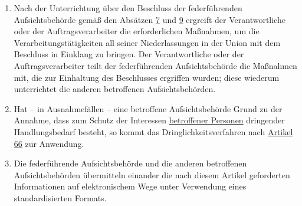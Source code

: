 \begin{enumerate}
  \item Nach der Unterrichtung über den Beschluss der federführenden Aufsichtsbehörde gemäß den Absätzen \hyperref
   [itm:60-7]{7} und \hyperref[itm:60-9]{9} ergreift der Verantwortliche oder der Auftragsverarbeiter die
   erforderlichen Maßnahmen, um die Verarbeitungstätigkeiten all seiner Niederlassungen in der Union mit dem Beschluss
   in Einklang zu bringen. Der Verantwortliche oder der Auftragsverarbeiter teilt der federführenden Aufsichtsbehörde
   die Maßnahmen mit, die zur Einhaltung des Beschlusses ergriffen wurden; diese wiederum unterrichtet die anderen
   betroffenen Aufsichtsbehörden.
  \label{itm:60-10}

  \item Hat -- in Ausnahmefällen -- eine betroffene Aufsichtsbehörde Grund zu der Annahme, dass zum Schutz der
   Interessen \hyperref[itm:04-1]{betroffener Personen} dringender Handlungsbedarf besteht, so kommt das Dringlichkeitsverfahren nach
   \hyperref[ch:66]{Artikel 66} zur Anwendung.
  \label{itm:60-11}

  \item Die federführende Aufsichtsbehörde und die anderen betroffenen Aufsichtsbehörden übermitteln einander die nach
   diesem Artikel geforderten Informationen auf elektronischem Wege unter Verwendung eines standardisierten Formats.
  \label{itm:60-12}

\end{enumerate}


